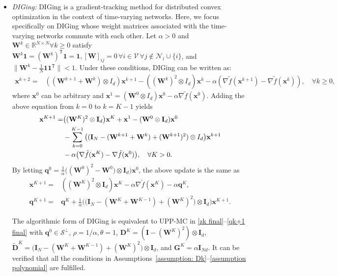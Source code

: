 \documentclass[12pt,draftcls,onecolumn]{IEEEtran}
\newcommand{\bx}{{\mathbf{x}}}
\newcommand{\bG}{{\mathbf{G}}}
\newcommand{\bI}{{\mathbf{I}}}
\newcommand{\bD}{{\mathbf{D}}}
\newcommand{\bW}{{\mathbf{W}}}
\begin{document}
\begin{itemize}
	\item[2)]\textit{DIGing:} DIGing \cite{nedic_achieving_2017} is a gradient-tracking method for distributed convex optimization in the context of time-varying networks. Here, we focus specifically on DIGing whose weight matrices associated with the time-varying networks commute with each other. Let $\alpha>0$ and $\bW^k \in \mathbb{R}^{N\times N}\forall k\geq 0$ satisfy $\bW^k\mathbf{1}=(\bW^k)^{\mathsf{T}}\mathbf{1} = \mathbf{1}, [\bW]_{ij}=0 \,\forall i\in \mathcal{V}\,\forall j \notin \mathcal{N}_i \cup \{i\}$, and $\|\bW^k-\frac{1}{N}\mathbf{1}\mathbf{1}^{\mathsf{T}}\|<1$. Under these conditions, DIGing can be written as:
	\begin{align*}
		\mathbf{x}^{k+2}=&((\bW^{k+1}+\bW^k)\otimes I_d)\mathbf{x}^{k+1}-((\bW^k)^2\otimes I_d)\mathbf{x}^k-\alpha (\nabla \tilde{f} (\mathbf{x}^{k+1})-\nabla \tilde{f}(\mathbf{x}^k)), \quad \forall k\geq 0,
	\end{align*} 
	where $\mathbf{x}^0$ can be arbitrary and $\mathbf{x}^1 = (\bW^0\otimes I_d)\mathbf{x}^0 - \alpha \nabla \tilde{f}(\mathbf{x}^0)$. Adding the above equation from $k=0$ to $k=K-1$ yields
	\begin{align*}
		\mathbf{x}^{K+1}=&\big((\bW^K)^2\otimes \bI_d\big)\mathbf{x}^K+\bx^1 - (
        \bW^0\otimes \bI_d)\mathbf{x}^0 \\&-\sum_{k=0}^{K-1}\big((\bI_N-(\bW^{k+1}+\bW^{k})+(\bW^{k+1})^2)\otimes I_d\big)\mathbf{x}^{k+1}\notag\\
        &- \alpha \big(\nabla \tilde{f}(\mathbf{x}^K)-\nabla \tilde{f}(\mathbf{x}^0)\big), \quad \forall K>0.
	\end{align*}
	By letting $\mathbf{q}^0=\frac{1}{\alpha}\big((\bW^0)^2-\bW^0\big)\otimes \bI_d)\mathbf{x}^0$, the above update is the same as
	\begin{align*}
		\mathbf{x}^{K+1}  =& ((\bW^K)^2\otimes \bI_d)\mathbf{x}^K - \alpha \nabla \tilde{f}(\mathbf{x}^K) - \alpha \mathbf{q}^K,\\
		\mathbf{q}^{K+1} =&  \mathbf{q}^{K} + \frac{1}{\alpha}\Big(\big(\bI_N-(\bW^K+\bW^{K-1})+(\bW^K)^2\big)\otimes \bI_d\Big)\mathbf{x}^{K+1}.
	\end{align*}

	The algorithmic form of DIGing is equivalent to UPP-MC in \eqref{zk final}--\eqref{qk+1 final} with $\mathbf{q}^0 \in \mathcal{S}^{\bot}$, $\rho =1/\alpha,\theta=1$, $\bD^K=(\bI-(\bW^K)^2)\otimes \bI_d,$ $\tilde{\bD}^K=\big(\bI_N-(\bW^K+\bW^{K-1})+(\bW^K)^2\big)\otimes \bI_d$, and $\bG^K= \alpha \bI_{Nd}$. It can be verified that all the conditions in Assumptions~\ref{assumption: Dk}--\ref{assumption polynomial} are fulfilled.


\end{itemize}
\end{document}
